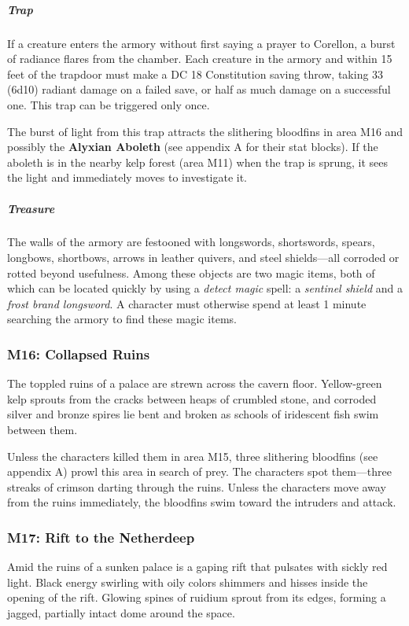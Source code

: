 \documentclass[10pt,a4paper,twoside,bg=print,twocolumn,openany,nodeprecatedcode]{dndbook}
\begin{document}
\subparagraph{Trap}
If a creature enters the armory without first saying a prayer to Corellon, a burst of radiance flares from the chamber. Each creature in the armory and within 15 feet of the trapdoor must make a DC 18 Constitution saving throw, taking 33 (6d10) radiant damage on a failed save, or half as much damage on a successful one. This trap can be triggered only once.

The burst of light from this trap attracts the slithering bloodfins in area M16 and possibly the \textbf{Alyxian Aboleth} (see appendix A for their stat blocks). If the aboleth is in the nearby kelp forest (area M11) when the trap is sprung, it sees the light and immediately moves to investigate it.

\subparagraph{Treasure}
The walls of the armory are festooned with longswords, shortswords, spears, longbows, shortbows, arrows in leather quivers, and steel shields—all corroded or rotted beyond usefulness. Among these objects are two magic items, both of which can be located quickly by using a \textit{detect magic} spell: a \textit{sentinel shield} and a \textit{frost brand longsword}. A character must otherwise spend at least 1 minute searching the armory to find these magic items.

\subsubsection{M16: Collapsed Ruins}
\begin{DndReadAloud}{}
The toppled ruins of a palace are strewn across the cavern floor. Yellow-green kelp sprouts from the cracks between heaps of crumbled stone, and corroded silver and bronze spires lie bent and broken as schools of iridescent fish swim between them.

\end{DndReadAloud}

Unless the characters killed them in area M15, three slithering bloodfins (see appendix A) prowl this area in search of prey. The characters spot them—three streaks of crimson darting through the ruins. Unless the characters move away from the ruins immediately, the bloodfins swim toward the intruders and attack.

\subsubsection{M17: Rift to the Netherdeep}
\begin{DndReadAloud}{}
Amid the ruins of a sunken palace is a gaping rift that pulsates with sickly red light. Black energy swirling with oily colors shimmers and hisses inside the opening of the rift. Glowing spines of ruidium sprout from its edges, forming a jagged, partially intact dome around the space.

\end{DndReadAloud}
\end{document}
